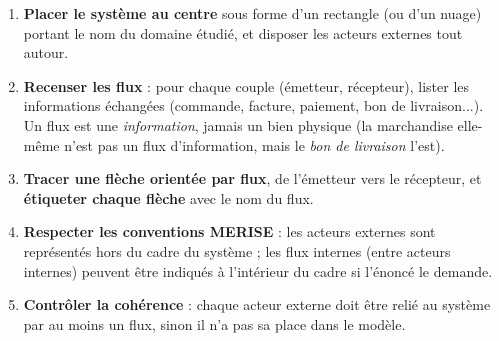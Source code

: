 \documentclass[11pt]{article}
\begin{document}
\begin{methode}
\begin{enumerate}
\item \textbf{Placer le système au centre} sous forme d'un rectangle (ou d'un nuage) portant le nom du domaine étudié, et disposer les acteurs externes tout autour.
\item \textbf{Recenser les flux} : pour chaque couple (émetteur, récepteur), lister les informations échangées (commande, facture, paiement, bon de livraison...). Un flux est une \emph{information}, jamais un bien physique (la marchandise elle-même n'est pas un flux d'information, mais le \emph{bon de livraison} l'est).
\item \textbf{Tracer une flèche orientée par flux}, de l'émetteur vers le récepteur, et \textbf{étiqueter chaque flèche} avec le nom du flux.
\item \textbf{Respecter les conventions MERISE} : les acteurs externes sont représentés hors du cadre du système ; les flux internes (entre acteurs internes) peuvent être indiqués à l'intérieur du cadre si l'énoncé le demande.
\item \textbf{Contrôler la cohérence} : chaque acteur externe doit être relié au système par au moins un flux, sinon il n'a pas sa place dans le modèle.
\end{enumerate}
\end{methode}
\end{document}
